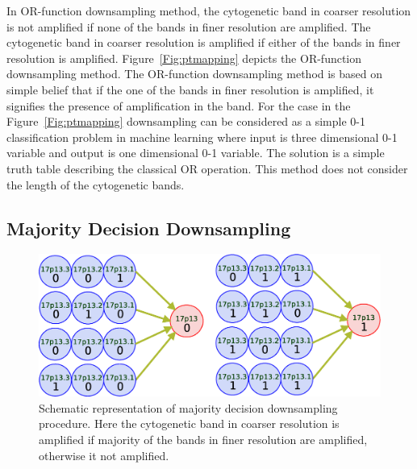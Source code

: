 In  OR-function downsampling method, the cytogenetic band in coarser resolution is not amplified if none of the bands in finer resolution are amplified. The cytogenetic band in coarser resolution is amplified if either of the bands in finer resolution is amplified. Figure~\ref{Fig:ptmapping} depicts the OR-function downsampling method. The OR-function downsampling method is based on simple belief that if the one of the bands in finer resolution is amplified, it signifies the presence of amplification in the band. For the case in the Figure~\ref{Fig:ptmapping} downsampling can be considered as a simple 0-1 classification problem in machine learning where input is three dimensional 0-1 variable and output is one dimensional 0-1 variable. The solution is a simple truth table describing the classical OR operation. This method does not consider the length of the cytogenetic bands.

\subsection{Majority Decision Downsampling}
\label{ss:majority}

\begin{figure}[h!]
\centering
\includegraphics[scale=0.35]{figures/mdmapping.eps}
\caption[Majority decision downsampling]{Schematic representation of majority decision downsampling procedure. Here the cytogenetic band in coarser resolution is amplified if majority of the bands in finer resolution are amplified, otherwise it not amplified.} \label{Fig:mdmapping}
\end{figure}

